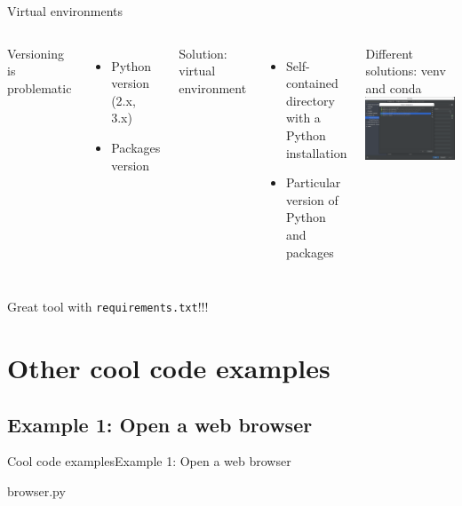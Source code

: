 \documentclass[10pt,compress]{beamer} %
\begin{document}
\begin{frame}{Virtual environments}
	\begin{columns}
            Versioning is problematic
            \begin{itemize}
                \item Python version (2.x, 3.x)
                \item Packages version
            \end{itemize}
            Solution: \alert{virtual environment}
            \begin{itemize}
                \item Self-contained directory with a Python installation
                \item Particular version of Python and packages
            \end{itemize}
        	Different solutions: venv and conda
	        \includegraphics[width=\linewidth]{figs/venv.png}\\
	\end{columns}
    \bigskip
	\centering Great tool with \texttt{requirements.txt}!!!
\end{frame}

\section{Other cool code examples}

\subsection{Example 1: Open a web browser}
\begin{frame}{Cool code examples}{Example 1: Open a web browser}
	\vspace{-0.2cm}
	\begin{exampleblock}{browser.py}
	\vspace{-0.2cm}
	
	\vspace{-0.2cm}
	\end{exampleblock}
\end{frame}
\end{document}
